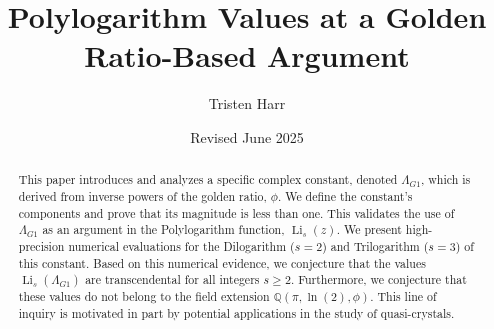 \documentclass{amsart}
\theoremstyle{plain}
\theoremstyle{definition}
\theoremstyle{remark}
\DeclareMathOperator{\Li}{Li} %
\newcommand{\LambdaG}{\Lambda_{G1}}
\newcommand{\phiG}{\phi}
\begin{document}
\title[Polylogarithms at a Golden Ratio Argument]{Polylogarithm Values at a Golden Ratio-Based Argument}
\author{Tristen Harr}
\date{Revised June 2025}

\begin{abstract}
This paper introduces and analyzes a specific complex constant, denoted $\LambdaG$, which is derived from inverse powers of the golden ratio, $\phiG$. We define the constant's components and prove that its magnitude is less than one. This validates the use of $\LambdaG$ as an argument in the Polylogarithm function, $\Li_s(z)$. We present high-precision numerical evaluations for the Dilogarithm ($s=2$) and Trilogarithm ($s=3$) of this constant. Based on this numerical evidence, we conjecture that the values $\Li_s(\LambdaG)$ are transcendental for all integers $s \ge 2$. Furthermore, we conjecture that these values do not belong to the field extension $\mathbb{Q}(\pi, \ln(2), \phiG)$. This line of inquiry is motivated in part by potential applications in the study of quasi-crystals.
\end{abstract}

\maketitle

\end{document}
